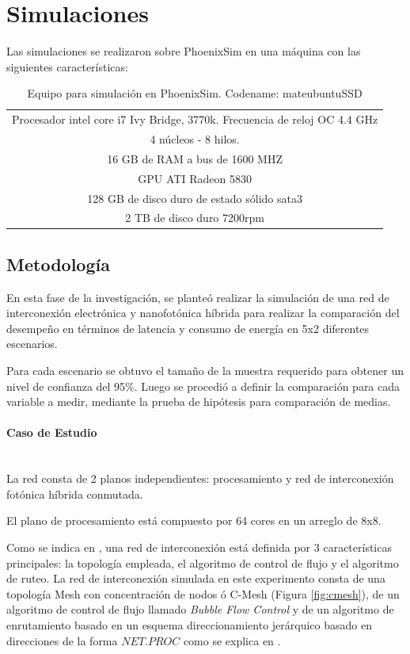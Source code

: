 \section{Simulaciones}

Las simulaciones se realizaron sobre PhoenixSim en una máquina con
las siguientes características:

\begin{table}[H]
\centering
\begin{tabular}{|c|}
\hline
Procesador intel core i7 Ivy Bridge, 3770k. Frecuencia de reloj OC 4.4 GHz \\
4 núcleos - 8 hilos. \\
16 GB de RAM a bus de 1600 MHZ \\
GPU ATI Radeon 5830 \\
128 GB  de disco duro de estado sólido sata3 \\
2 TB de disco duro 7200rpm \\
\hline
\end{tabular}
\caption{Equipo para simulación en PhoenixSim. Codename: mateubuntuSSD}
\label{tb:pcsim3}
\end{table} 

\subsection{Metodología}
En esta fase de la investigación, se planteó realizar la simulación de 
una red de interconexión electrónica y nanofotónica híbrida para 
realizar la comparación del desempeño en términos de latencia y consumo
de energía en 5x2 diferentes escenarios.

Para cada escenario se obtuvo el tamaño de la muestra requerido
para obtener un nivel de confianza del 95\%. Luego se procedió
a definir la comparación para cada variable a medir, 
mediante la prueba de hipótesis para comparación de medias. 

\paragraph{Caso de Estudio} ~\\
La red consta de 2 planos independientes: procesamiento y
red de interconexión fotónica híbrida conmutada. 

El plano de procesamiento está compuesto por 64 
cores en un arreglo de 8x8. 

Como se indica en \cite{dally2004principles}, una red de interconexión está definida
por 3 características principales: la topología empleada, el algoritmo de control de
flujo y el algoritmo de ruteo. La red de interconexión simulada en este experimento
consta de una topología Mesh con concentración de nodos ó C-Mesh (Figura \ref{fig:cmesh}), 
de un algoritmo de control de
flujo llamado \textit{Bubble Flow Control}\cite{puente1999adaptive}\cite{Manual} y
de un algoritmo de enrutamiento basado en un esquema direccionamiento jerárquico
basado en direcciones de la forma $NET.PROC$ como se explica en \cite{Manual}.


